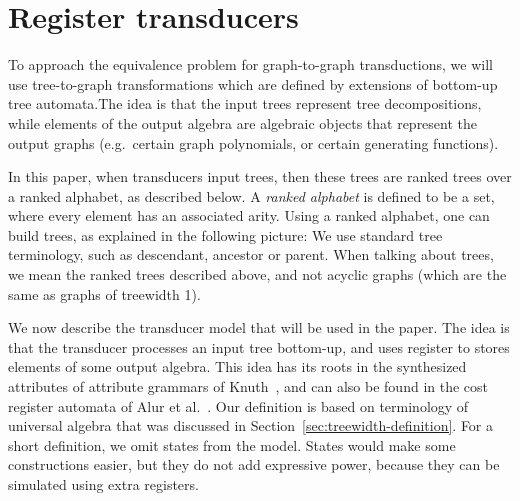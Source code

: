 \section{Register transducers}
To approach the equivalence problem for graph-to-graph transductions, we will use tree-to-graph transformations which are defined by extensions of bottom-up tree automata.The idea is that the input trees represent tree decompositions, while elements of the output algebra are algebraic objects that represent the output graphs (e.g.~certain graph polynomials, or certain generating functions). 

In this paper, when transducers input trees, then these trees are  ranked trees over a ranked alphabet, as described below. A \emph{ranked alphabet} is defined to be  a set, where every element has an associated arity. Using a ranked alphabet, one can build trees, as explained in the following picture:
We use standard tree terminology, such as descendant, ancestor or parent. When talking about trees, we mean the ranked trees described above, and not acyclic graphs (which are the same as graphs of treewidth 1). 

We now describe the transducer model that will be used in the paper. The idea is that the transducer processes an input tree bottom-up, and uses register to stores elements of some output algebra.  This idea has its roots in the synthesized attributes of attribute grammars of Knuth~\cite{Knuth:1968aa}, and can also be found in the cost register automata of Alur et al.~\cite[p.~15]{alurDantoniDeshmukhYuan2013}. Our definition is based on  terminology of universal algebra that was discussed in Section~\ref{sec:treewidth-definition}.
For a short definition, we omit states from the model.  States would make some constructions easier, but they do not add expressive power, because they  can be simulated using extra registers.

